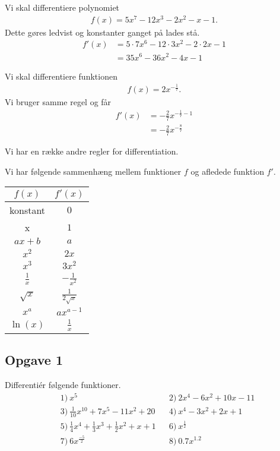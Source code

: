 \documentclass[12pt]{article}
\begin{document}
\begin{exa}
	Vi skal differentiere polynomiet 
	\begin{align*}
		f(x) = 5x^7-12x^3-2x^2-x-1.
	\end{align*}
	Dette gøres ledvist og konstanter ganget på lades stå.
	\begin{align*}
		f'(x) &= 5\cdot 7x^6 - 12\cdot 3x^2-2\cdot 2x-1\\
		&= 35x^6-36x^2-4x-1
	\end{align*}
\end{exa}

\begin{exa}
	Vi skal differentiere funktionen 
	\begin{align*}
		f(x) = 2x^{-\frac{1}{7}}.
	\end{align*}
	Vi bruger samme regel og får
	\begin{align*}
	 	f'(x) &= -\frac{2}{7}x^{-\frac{1}{7}-1} \\
	 	&= -\frac{2}{7}x^{-\frac{8}{7}}
	\end{align*}
\end{exa}

Vi har en række andre regler for differentiation.
\begin{setn}
Vi har følgende sammenhæng mellem funktioner $f$ og afledede funktion $f'$.
\begin{center}
\begin{tabular}{c|c}
$f(x)$& $f'(x)$\\
\hline
\textnormal{konstant}&$0$\\
\hline
x&$1$\\
\hline
$ax+b$&$a$\\
\hline
$x^2$&$2x$\\
\hline
$x^3$&$3x^2$\\
\hline
$\frac{1}{x}$&$-\frac{1}{x^2}$\\
\hline
$\sqrt{x}$&$\frac{1}{2\sqrt{x}}$\\
\hline
$x^a$ & $ax^{a-1}$\\
\hline
$\ln(x)$ & $\frac{1}{x}$

\end{tabular}
\end{center}
\end{setn}

\subsection*{Opgave 1}
Differentiér følgende funktioner.
\begin{align*}
	&1) \ x^5   &&2) \ 2x^4-6x^2+10x-11     \\
	&3) \ \frac{1}{10}x^{10}+7x^5-11x^2+20  &&4) \ x^4-3x^2+2x+1     \\ 
	&5) \ \frac{1}{4}x^4 + \frac{1}{3}x^3+\frac{1}{2}x^2+x + 1  &&6) \  x^\frac{1}{2}    \\ 
	&7) \ 6x^{\frac{-5}{2}}  &&8) \  0.7x^{1.2}    \\ 
\end{align*}
\end{document}
